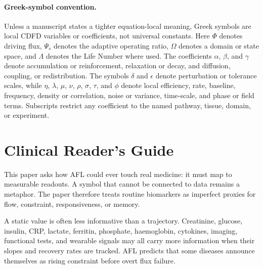 \documentclass[12pt,a4paper]{article}
\begin{document}
\begin{abstract}
\textbf{Status: Inferred}

\medskip
\noindent Within the extended framework of this series, biological networks are modeled as \emph{Adaptive Surfaces} that dynamically integrate physiological load and retain structural memory. The system's health is governed by the adaptive ratio $\Psi_s = (\Phi/C) \cdot S \cdot M_s$, where homeostasis ($\Psi_s \approx 1.0$) is maintained near the stable attractor ($S \cdot M_s \approx 1.0$), and disease emerges as surface dysregulation when maladaptive memory locks tissues into chronic constraint.

\end{abstract}


\paragraph{Greek-symbol convention.}
Unless a manuscript states a tighter equation-local meaning, Greek symbols are local CDFD variables or coefficients, not universal constants. Here $\Phi$ denotes driving flux, $\Psi_s$ denotes the adaptive operating ratio, $\Omega$ denotes a domain or state space, and $\Lambda$ denotes the Life Number where used. The coefficients $\alpha$, $\beta$, and $\gamma$ denote accumulation or reinforcement, relaxation or decay, and diffusion, coupling, or redistribution. The symbols $\delta$ and $\epsilon$ denote perturbation or tolerance scales, while $\eta$, $\lambda$, $\mu$, $\nu$, $\rho$, $\sigma$, $\tau$, and $\phi$ denote local efficiency, rate, baseline, frequency, density or correlation, noise or variance, time-scale, and phase or field terms. Subscripts restrict any coefficient to the named pathway, tissue, domain, or experiment.

\section*{Clinical Reader's Guide}
This paper asks how AFL could ever touch real medicine: it must map to measurable readouts. A symbol that cannot be connected to data remains a metaphor. The paper therefore treats routine biomarkers as imperfect proxies for flow, constraint, responsiveness, or memory.

A static value is often less informative than a trajectory. Creatinine, glucose, insulin, CRP, lactate, ferritin, phosphate, haemoglobin, cytokines, imaging, functional tests, and wearable signals may all carry more information when their slopes and recovery rates are tracked. AFL predicts that some diseases announce themselves as rising constraint before overt flux failure.
\end{document}

